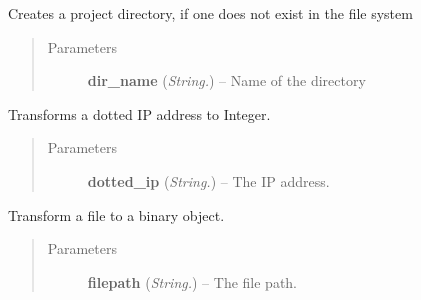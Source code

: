 \documentclass[letterpaper,10pt,english]{sphinxmanual}
\begin{document}

\begin{fulllineitems}
\label{api:utils.CreateProjectDir}
Creates a project directory, if one does not exist in the file system
\begin{quote}\begin{description}
\item[{Parameters}] \leavevmode
\textbf{dir\_name} (\emph{String.}) -- Name of the directory

\end{description}\end{quote}

\end{fulllineitems}


\begin{fulllineitems}
\label{api:utils.DottedIPToInt}
Transforms a dotted IP address to Integer.
\begin{quote}\begin{description}
\item[{Parameters}] \leavevmode
\textbf{dotted\_ip} (\emph{String.}) -- The IP address.

\end{description}\end{quote}

\end{fulllineitems}


\begin{fulllineitems}
\label{api:utils.FileToBase64}
Transform a file to a binary object.
\begin{quote}\begin{description}
\item[{Parameters}] \leavevmode
\textbf{filepath} (\emph{String.}) -- The file path.

\end{description}\end{quote}

\end{fulllineitems}

\end{document}
